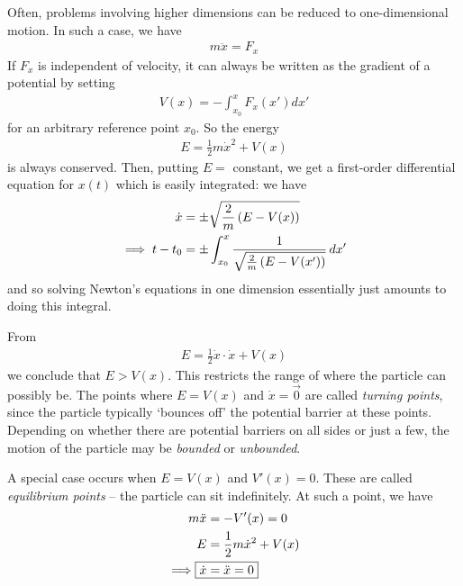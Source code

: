 \documentclass{../template/note}
\begin{document}
    Often, problems involving higher dimensions can be reduced to one-dimensional motion. In such a case, we have
    \begin{align*}
        m \ddot x = F_x
    \end{align*}
    If \(F_x\) is independent of velocity, it can always be written as the gradient of a potential by setting
    \begin{align*}
        V(x) = -\int_{x_0}^x F_x(x') dx'
    \end{align*}
    for an arbitrary reference point \(x_0\). So the energy
    \begin{align*}
        E = \frac{1}{2} m \dot x^2 + V(x)
    \end{align*}
    is always conserved. Then, putting \(E = \) constant, we get a first-order differential equation for \(x(t)\) which is easily integrated: we have
    \begin{align*}
        \dot x &= \pm \sqrt{\frac 2 m \left(E - V(x)\right)} \\
        \implies t - t_0 &= \pm \int_{x_0}^x \frac{1}{\sqrt{\frac 2 m \left(E - V(x')\right)}} \,d{x}'
    \end{align*}
    and so solving Newton's equations in one dimension essentially just amounts to doing this integral.


    \noindent From
    \begin{align*}
        E = \frac{1}{2} \dot{x} \cdot \dot{x} + V(x)
    \end{align*}
    we conclude that \(E > V(x)\). This restricts the range of where the particle can possibly be. The points where \(E = V(x)\) and \(\dot{x} = \vec 0\) are called \emph{turning points}, since the particle typically `bounces off' the potential barrier at these points. Depending on whether there are potential barriers on all sides or just a few, the motion of the particle may be \emph{bounded} or \emph{unbounded}.

    A special case occurs when \(E = V(x)\) and \(V'(x) = 0\). These are called \emph{equilibrium points} -- the particle can sit indefinitely. At such a point, we have
    \begin{align*}
        m \ddot x &= -V'(x) = 0 \\
        E &= \frac 1 2 m \dot x^2 + V(x) \\
        \implies \Aboxed{\dot x &= \ddot x = 0}
    \end{align*}
    
\end{document}
